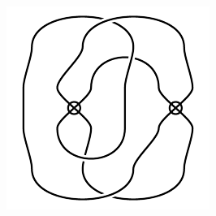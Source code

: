 \begin{figure}[H]
\begin{minipage}[b]{.18\linewidth}
\end{minipage}
\begin{minipage}[b]{.18\linewidth}
\centering
\includegraphics[width=\linewidth]{../data/virtual_4_31.png}
\end{minipage}
\end{figure}


